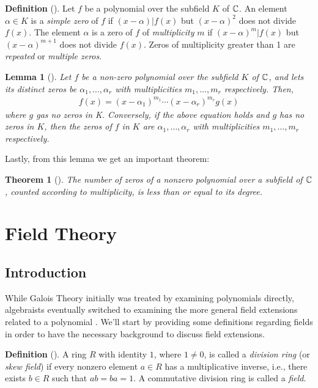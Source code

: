 \documentclass[11pt, a4paper, oneside]{article}
\theoremstyle{plain}
\newtheorem*{thm*}{Theorem}
\theoremstyle{plain}
\theoremstyle{plain}
\newtheorem*{lemma*}{Lemma}
\theoremstyle{plain}
\theoremstyle{definition}
\theoremstyle{example}
\begin{document}
\textbf{Definition} (\cite[Definition 3.26]{stewart}). Let $f$ be a polynomial over the subfield $K$ of $\mathbb{C}$. An element $\alpha \in K$ is a \textit{simple zero} of $f$ if $(x - \alpha) | f(x)$ but $(x - \alpha)^2$ does not divide $f(x)$. The element $\alpha$ is a zero of $f$ of \textit{multiplicity} $m$ if $(x - \alpha)^m | f(x)$ but $(x - \alpha)^{m+1}$ does not divide $f(x)$. Zeros of multiplicity greater than 1 are \textit{repeated} or \textit{multiple zeros}.

\begin{lemma*}[{\cite[Lemma\ 3.27]{stewart}}] 
Let $f$ be a non-zero polynomial over the subfield $K$ of $\mathbb{C}$, and lets its distinct zeros be $\alpha_1, \ldots, \alpha_r$ with multiplicities $m_1, \ldots, m_r$ respectively. Then,
\begin{align*}
f(x) = (x - \alpha_1)^{m_1} \cdots (x - \alpha_r)^{m_r}g(x)
\end{align*}
where $g$ gas no zeros in K. Conversely, if the above equation holds and $g$ has no zeros in $K$, then the zeros of $f$ in $K$ are $\alpha_1, \ldots, \alpha_r$ with multiplicities $m_1, \ldots, m_r$ respectively.
\end{lemma*}

Lastly, from this lemma we get an important theorem:

\begin{thm*}[{\cite[Thm.\ 3.28]{stewart}}] 
The number of zeros of a nonzero polynomial over a subfield of $\mathbb{C}$, counted according to multiplicity, is less than or equal to its degree.
\end{thm*}

\section{Field Theory}

\subsection{Introduction}

While Galois Theory initially was treated by examining polynomials directly, algebraists eventually switched to examining the more general field extensions related to a polynomial \cite[\S 4, p. 63]{stewart}. We'll start by providing some definitions regarding fields in order to have the necessary background to discuss field extensions.

\textbf{Definition} (\cite[\S 7.1]{dummit}). A ring $R$ with identity $1$, where $1 \neq 0$, is called a \textit{division ring} (or \textit{skew field}) if every nonzero element $a \in R$ has a multiplicative inverse, i.e., there exists $b \in R$ such that $ab = ba = 1$. A commutative division ring is called a \textit{field}.
\end{document}
